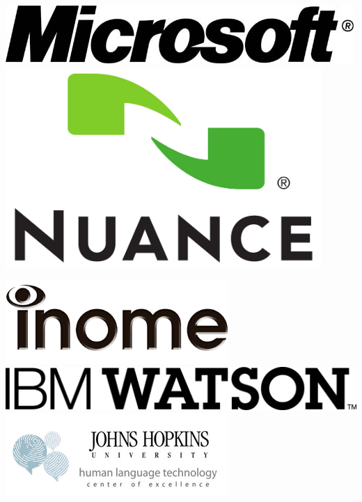 \vspace*{\fill}
\noindent
\includegraphics[width=\textwidth]{logos/mslogo-1_72dpi-Oct2013.jpg}\\[1.5in]
\includegraphics[width=0.9\textwidth]{logos/Large_Nuance_Logo.pdf}\\
\vspace*{\fill}

\clearpage

\noindent
\includegraphics[width=\textwidth]{logos/inome.png}\\[1in]
\includegraphics[width=\textwidth]{logos/IBM_Watson_TM_pos.jpg}\\[1in]
\includegraphics[width=\textwidth]{logos/hltcoe-side-balloons.png}
\vspace*{\fill}

\clearpage

\renewcommand{\leftheader}{}
\renewcommand{\rightheader}{}
